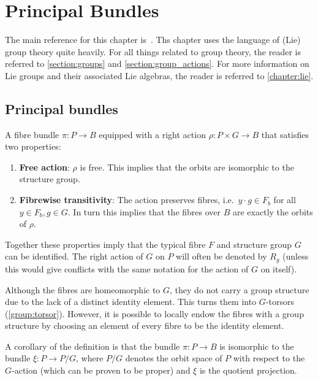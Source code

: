 \chapter{Principal Bundles}\label{chapter:principal_bundles}

    The main reference for this chapter is~\citet{sontz_principal_2015}. Ths chapter uses the language of (Lie) group theory quite heavily. For all things related to group theory, the reader is referred to \cref{section:groups} and \cref{section:group_actions}. For more information on Lie groups and their associated Lie algebras, the reader is referred to \cref{chapter:lie}.

\section{Principal bundles}

    \begin{definition}
        A fibre bundle $\pi:P\rightarrow B$ equipped with a right action $\rho:P\times G\rightarrow B$ that satisfies two properties:
        \begin{enumerate}
            \item\textbf{Free action}: $\rho$ is free. This implies that the orbits are isomorphic to the structure group.
            \item\textbf{Fibrewise transitivity}: The action preserves fibres, i.e.~$y\cdot g\in F_b$ for all $y\in F_b,g\in G$. In turn this implies that the fibres over $B$ are exactly the orbits of $\rho$.
        \end{enumerate}
        Together these properties imply that the typical fibre $F$ and structure group $G$ can be identified. The right action of $G$ on $P$ will often be denoted by $R_g$ (unless this would give conflicts with the same notation for the action of $G$ on itself).
    \end{definition}
    \begin{remark}[$G$-torsor]\label{bundle:fibre_torsor}
        Although the fibres are homeomorphic to $G$, they do not carry a group structure due to the lack of a distinct identity element. This turns them into $G$-torsors (\cref{group:torsor}). However, it is possible to locally endow the fibres with a group structure by choosing an element of every fibre to be the identity element.
    \end{remark}

    \begin{property}
        A corollary of the definition is that the bundle $\pi:P\rightarrow B$ is isomorphic to the bundle $\xi:P\rightarrow P/G$, where $P/G$ denotes the orbit space of $P$ with respect to the $G$-action (which can be proven to be proper) and $\xi$ is the quotient projection.
    \end{property}

